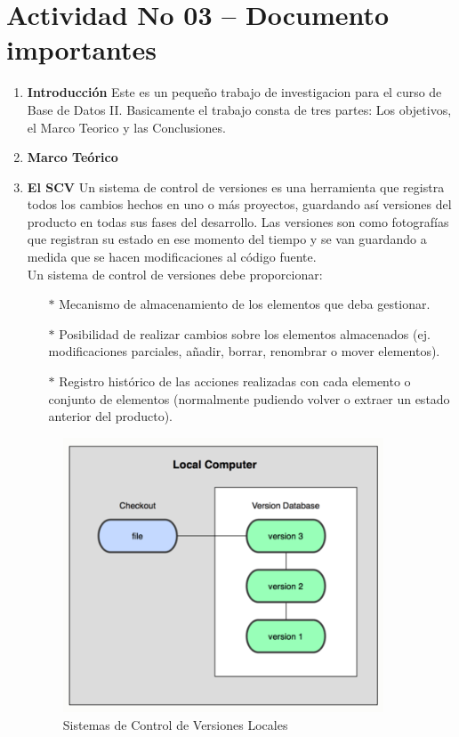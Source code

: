 \section{Actividad No 03 – Documento importantes} 
		
\begin{enumerate}
\item \textbf{Introducción}
Este es un pequeño trabajo de investigacion para el curso de Base de Datos II.
Basicamente el trabajo consta de tres partes: Los objetivos, el Marco Teorico y las Conclusiones. \\

\item \textbf{Marco Teórico}

\item \textbf{El SCV}
Un sistema de control de versiones es una herramienta que registra todos los cambios hechos en uno o más proyectos, guardando así versiones del producto en todas sus fases del desarrollo. Las versiones son como fotografías que registran su estado en ese momento del tiempo y se van guardando a medida que se hacen modificaciones al código fuente.
\\Un sistema de control de versiones debe proporcionar:
\begin{itemize}
	\item[$*$] Mecanismo de almacenamiento de los elementos que deba gestionar.
	\item[$*$] Posibilidad de realizar cambios sobre los elementos almacenados (ej. modificaciones parciales, añadir, borrar, renombrar o mover elementos).
	\item[$*$] Registro histórico de las acciones realizadas con cada elemento o conjunto de elementos (normalmente pudiendo volver o extraer un estado anterior del producto).
\end{itemize}

\begin{figure}
\begin{center}
  \includegraphics[width=0.9\textwidth]{Imagenes/grafico1.png}
\caption{Sistemas de Control de Versiones Locales}
\end{center}
\end{figure}


\end{enumerate}
